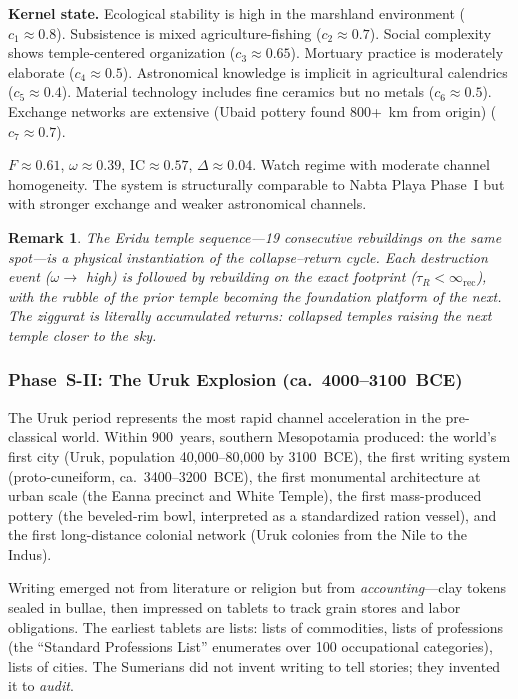 \documentclass[
  aps,
  prd,
  twocolumn,
  superscriptaddress,
  nofootinbib,
  floatfix
]{revtex4-2}
\newtheorem{remark}{Remark}
\newcommand{\tR}{\tau_{\!R}}
\newcommand{\IR}{\infty_{\mathrm{rec}}}
\newcommand{\IC}{\mathrm{IC}}
\begin{document}
\textbf{Kernel state.}  Ecological stability is high
in the marshland environment ($c_1 \approx 0.8$).
Subsistence is mixed agriculture-fishing ($c_2
\approx 0.7$).  Social complexity shows temple-centered
organization ($c_3 \approx 0.65$).  Mortuary practice
is moderately elaborate ($c_4 \approx 0.5$).
Astronomical knowledge is implicit in agricultural
calendrics ($c_5 \approx 0.4$).  Material technology
includes fine ceramics but no metals ($c_6 \approx
0.5$).  Exchange networks are extensive (Ubaid pottery
found 800+~km from origin) ($c_7 \approx 0.7$).

$F \approx 0.61$, $\omega \approx 0.39$,
$\IC \approx 0.57$, $\Delta \approx 0.04$.
Watch regime with moderate channel homogeneity.  The
system is structurally comparable to Nabta Playa
Phase~I but with stronger exchange and weaker
astronomical channels.

\begin{remark}
The Eridu temple sequence---19 consecutive
rebuildings on the same spot---is a physical
instantiation of the collapse--return cycle.  Each
destruction event ($\omega \to$ high) is followed by
rebuilding on the exact footprint ($\tR < \IR$),
with the rubble of the prior temple becoming the
foundation platform of the next.  The ziggurat is
literally \emph{accumulated returns}: collapsed
temples raising the next temple closer to the sky.
\end{remark}


\subsubsection{Phase~S-II: The Uruk Explosion
(ca.\ 4000--3100~BCE)}\label{sec:uruk}

The Uruk period represents the most rapid channel
acceleration in the pre-classical world.  Within
900~years, southern Mesopotamia produced: the world's
first city (Uruk, population 40,000--80,000 by
3100~BCE), the first writing system (proto-cuneiform,
ca.\ 3400--3200~BCE), the first monumental architecture
at urban scale (the Eanna precinct and White Temple),
the first mass-produced pottery (the beveled-rim bowl,
interpreted as a standardized ration vessel), and the
first long-distance colonial network (Uruk colonies
from the Nile to the Indus).

Writing emerged not from literature or religion but
from \emph{accounting}---clay tokens sealed in
bullae, then impressed on tablets to track grain
stores and labor obligations.  The earliest tablets
are lists: lists of commodities, lists of professions
(the ``Standard Professions List'' enumerates over
100 occupational categories), lists of cities.  The
Sumerians did not invent writing to tell stories;
they invented it to \emph{audit}.
\end{document}
